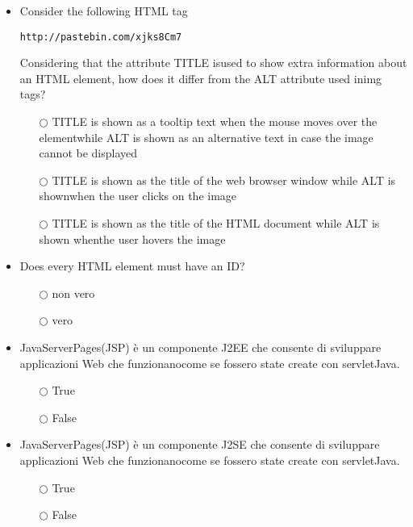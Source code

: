 \documentclass[10pt,twocolumn]{article}
\begin{document}
\begin{itemize}
    \item Consider the following HTML tag
          \begin{verbatim}
http://pastebin.com/xjks8Cm7
\end{verbatim}
          Considering that the attribute TITLE isused to show extra information about an HTML element, how does it differ from the ALT attribute used inimg tags?
          \begin{itemize}
              \item[$\bigcirc$] TITLE is shown as a tooltip text when the mouse moves over the elementwhile ALT is shown as an alternative text in case the image cannot be displayed
              \item[$\bigcirc$] TITLE is shown as the title of the web browser window while ALT is shownwhen the user clicks on the image
              \item[$\bigcirc$] TITLE is shown as the title of the HTML document while ALT is shown whenthe user hovers the image
          \end{itemize}
\end{itemize}
\begin{itemize}
    \item Does every HTML element must have an ID?
          \begin{itemize}
              \item[$\bigcirc$] non vero
              \item[$\bigcirc$] vero
          \end{itemize}
\end{itemize}
\begin{itemize}
    \item JavaServerPages(JSP) è un componente J2EE che consente di sviluppare applicazioni Web che funzionanocome se fossero state create con servletJava.
          \begin{itemize}
              \item[$\bigcirc$] True
              \item[$\bigcirc$] False
          \end{itemize}
\end{itemize}
\begin{itemize}
    \item JavaServerPages(JSP) è un componente J2SE che consente di sviluppare applicazioni Web che funzionanocome se fossero state create con servletJava.
          \begin{itemize}
              \item[$\bigcirc$] True
              \item[$\bigcirc$] False
          \end{itemize}
\end{itemize}
\end{document}
